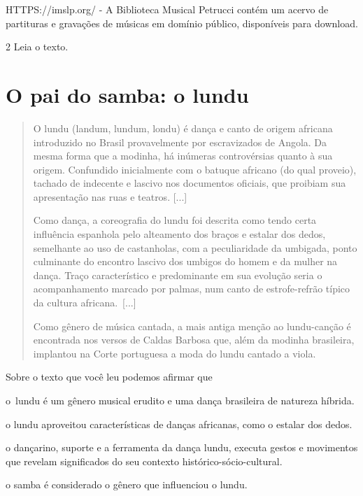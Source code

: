 \begin{escolha}
{HTTPS://imslp.org/ - A Biblioteca Musical
Petrucci contém um acervo de partituras e gravações de músicas em
domínio público, disponíveis para download.}

\num{2} Leia o texto.

\section{O pai do samba: o lundu}

\begin{quote}
O lundu (landum, lundum, londu) é dança e canto de origem africana
introduzido no Brasil provavelmente por escravizados de Angola. Da mesma
forma que a modinha, há inúmeras controvérsias quanto à sua origem.
Confundido inicialmente com o batuque africano (do qual proveio),
tachado de indecente e lascivo nos documentos oficiais, que proibiam sua
apresentação nas ruas e teatros. {[}...{]}

Como dança, a coreografia do lundu foi descrita como tendo certa
influência espanhola pelo alteamento dos braços e estalar dos dedos,
semelhante ao uso de castanholas, com a peculiaridade da umbigada, ponto
culminante do encontro lascivo dos umbigos do homem e da mulher na
dança. Traço característico e predominante em sua evolução seria o
acompanhamento marcado por palmas, num canto de estrofe-refrão típico da
cultura africana.~{[}...{]}

Como gênero de música cantada, a mais antiga menção ao lundu-canção é
encontrada nos versos de Caldas Barbosa que, além da modinha brasileira,
implantou na Corte portuguesa a moda do lundu cantado a viola.

\end{quote}

Sobre o texto que você leu podemos afirmar que

\begin{escolha}
\item
  o~lundu é um gênero musical erudito e uma dança brasileira de
  natureza híbrida.
\item
  o lundu aproveitou características de danças africanas, como o estalar
  dos dedos.
\item
  o dançarino, suporte e a ferramenta da dança lundu, executa gestos e
  movimentos que revelam significados do seu contexto
  histórico-sócio-cultural.
\item
  o samba é considerado o gênero que influenciou o lundu.
\end{escolha}


\end{escolha}

